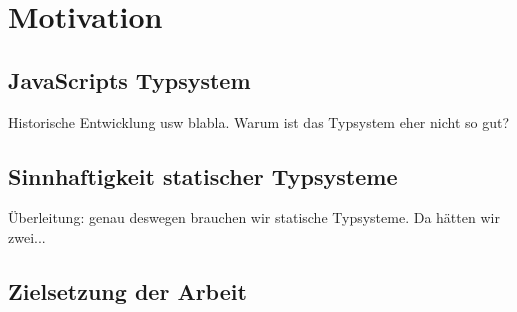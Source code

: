 \chapter{Motivation}

\section{JavaScripts Typsystem}

Historische Entwicklung usw blabla. Warum ist das Typsystem eher nicht so gut?

\section{Sinnhaftigkeit statischer Typsysteme}

Überleitung: genau deswegen brauchen wir statische Typsysteme. Da hätten wir zwei...

\section{Zielsetzung der Arbeit}
